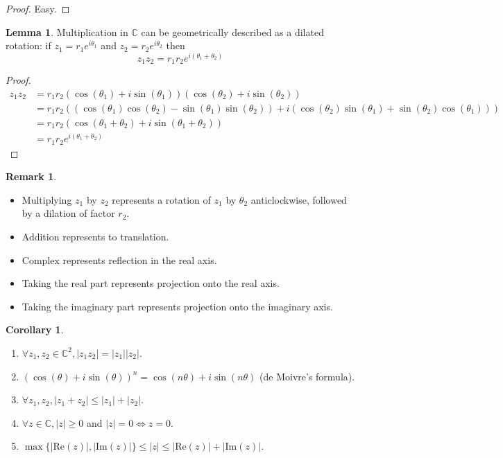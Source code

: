 \documentclass[12pt,a4paper]{article}
\theoremstyle{definition}
\newtheorem{corollary}[definition]{Corollary}
\newtheorem{lemma}[definition]{Lemma}
\newtheorem*{remark}{Remark}
\begin{document}
\begin{proof}
	Easy.
\end{proof}

\begin{lemma}
	Multiplication in $\mathbb{C}$ can be geometrically described as a dilated rotation: if $z_1 = r_1 e^{i \theta_1}$ and $z_2 = r_2 e^{i \theta_2}$ then
	\[
		z_1 z_2 = r_1 r_2 e^{i (\theta_1 + \theta_2)}
	\]
\end{lemma}

\begin{proof}
	\[
		\begin{aligned}
			z_1 z_2
				& = r_1 r_2 (\cos(\theta_1) + i \sin(\theta_1)) (\cos(\theta_2) + i \sin(\theta_2)) \\
				& = r_1 r_2 ((\cos(\theta_1) \cos(\theta_2) - \sin(\theta_1) \sin(\theta_2)) + i (\cos(\theta_2) \sin(\theta_1) + \sin(\theta_2) \cos(\theta_1))) \\
				& = r_1 r_2 (\cos(\theta_1 + \theta_2) + i \sin(\theta_1 + \theta_2)) \\
				& = r_1 r_2 e^{i (\theta_1 + \theta_2)}
		\end{aligned}
	\]
\end{proof}

\begin{remark}
	\hfill
	\begin{itemize}
		\item Multiplying $z_1$ by $z_2$ represents a rotation of $z_1$ by $\theta_2$ anticlockwise, followed by a dilation of factor $r_2$.
		\item Addition represents to translation.
		\item Complex represents reflection in the real axis.
		\item Taking the real part represents projection onto the real axis.
		\item Taking the imaginary part represents projection onto the imaginary axis.
	\end{itemize}
\end{remark}

\begin{corollary}
	\hfill
	\begin{enumerate}
		\item $\forall z_1, z_2 \in \mathbb{C}^2, |z_1 z_2| = |z_1| |z_2|$.
		\item ${(\cos(\theta) + i \sin(\theta))}^n = \cos(n \theta) + i \sin(n \theta)$ (de Moivre's formula).
		\item $\forall z_1, z_2, |z_1 + z_2| \le |z_1| + |z_2|$.
		\item $\forall z \in \mathbb{C}, |z| \ge 0$ and $|z| = 0 \Longleftrightarrow z = 0$.
		\item $\max \{ |\text{Re}(z)|, |\text{Im}(z)| \} \le |z| \le |\text{Re}(z)| + |\text{Im}(z)|$.
	\end{enumerate}
\end{corollary}
\end{document}

